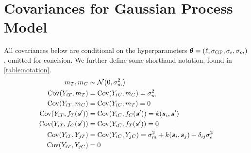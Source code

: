 \section{Covariances for Gaussian Process Model}
\label{sec:covariances}
All covariances below are conditional on the hyperparameters \(\bm{\theta} = \left\lparen\ell,\sigma_{\mathrm{GP}}, \sigma_{\epsilon}, \sigma_{m}\right\rparen\), omitted for concision.
We further define some shorthand notation, found in \autoref{table:notation}.
\begin{equation}
    \begin{split}
        m_\treat, m_\ctrol   &\sim \normal\del{0,\sigmamu^2} \\
        \cov(Y_{i\treat},m_\treat)  &= \cov(Y_{i\ctrol},m_\ctrol) = \sigmamu^2 \\
        \cov(Y_{i\treat},m_\ctrol)  &= \cov(Y_{i\ctrol},m_\treat)  = 0 \\
        \cov\del{Y_{i\treat}, f_{\treat}(\svec')} &= \cov\del{Y_{i\ctrol}, f_{\ctrol}(\svec')} = k(\svec_i,\svec') \\
        \cov\del{Y_{i\treat}, f_{\ctrol}(\svec')} &= \cov\del{Y_{i\ctrol}, f_{\treat}(\svec')} = 0 \\
        \cov(Y_{i\treat},Y_{j\treat}) &= \cov(Y_{i\ctrol},Y_{j\ctrol}) = \sigmamu^2 + k(\svec_i,\svec_j) + \delta_{ij}\sigman^2 \\
        \cov(Y_{i\treat},Y_{j\ctrol}) &= 0
    \end{split}
    \label{eq:covariances}
\end{equation}

